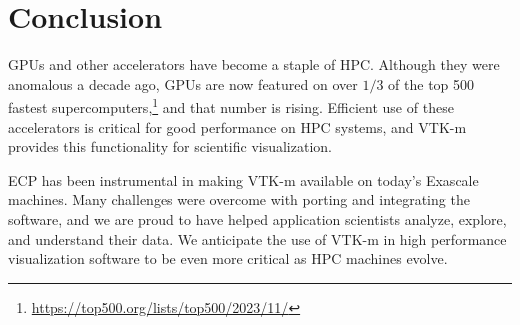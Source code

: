 \section{Conclusion}


GPUs and other accelerators have become a staple of HPC.
Although they were anomalous a decade ago, GPUs are now featured on over $1/3$ of the top 500 fastest supercomputers,\footnote{\url{https://top500.org/lists/top500/2023/11/}} and that number is rising.
Efficient use of these accelerators is critical for good performance on HPC systems, and VTK-m provides this functionality for scientific visualization.

ECP has been instrumental in making VTK-m available on today's Exascale machines.
Many challenges were overcome with porting and integrating the software, and we are proud to have helped application scientists analyze, explore, and understand their data.
We anticipate the use of VTK-m in high performance visualization software to be even more critical as HPC machines evolve.
